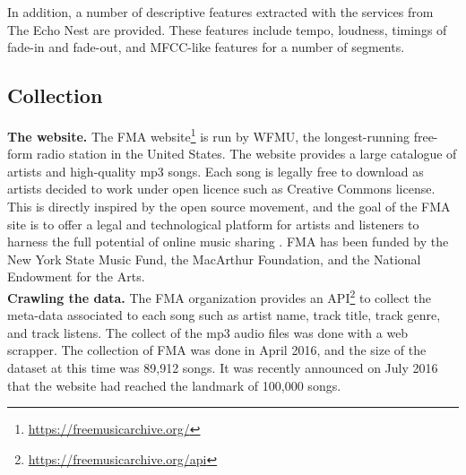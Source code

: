 \documentclass{article}
\begin{document}
In addition, a number of descriptive features extracted with the services from The Echo Nest are provided. These features include tempo, loudness, timings of fade-in and fade-out, and MFCC-like features for a number of segments.

\subsection{Collection} %

\noindent
{\bf The website.} The FMA website\footnote{\url{https://freemusicarchive.org/}} is run by WFMU, the longest-running free-form radio station in the United States. The website provides a large catalogue of artists and high-quality mp3 songs. Each song is legally free to download as artists decided to work under open licence such as Creative Commons license. This is directly inspired by the open source movement, and the goal of the FMA site is to offer a legal and technological platform for artists and listeners to harness the full potential of online music sharing \cite{art:MossFMA}. FMA has been funded by the New York State Music Fund, the MacArthur Foundation, and the National Endowment for the Arts.\\



\noindent
{\bf Crawling the data.} The FMA organization provides an API\footnote{\url{https://freemusicarchive.org/api}} to collect the meta-data associated to each song such as artist name, track title, track genre, and track listens. The collect of the mp3 audio files was done with a web scrapper. The collection of FMA was done in April 2016, and the size of the dataset at this time was 89,912 songs. It was recently announced on July 2016 that the website had reached the landmark of 100,000 songs. \\
\end{document}
